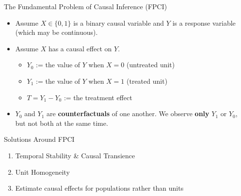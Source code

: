 \documentclass{beamer}
\begin{document}
\begin{frame}{The Fundamental Problem of Causal Inference (FPCI)}
  \begin{itemize}
    \item<+-> Assume $X \in\{0,1\}$ is a binary causal variable and $Y$ is a response variable (which may be continuous).
    \item<+-> Assume $X$ has a causal effect on $Y$.
    \begin{itemize}
      \item $Y_0$ := the value of $Y$ when $X=0$ (untreated unit)
      \item $Y_1$ := the value of $Y$ when $X=1$ (treated unit)
      \item $T = Y_1 - Y_0$ := the treatment effect
    \end{itemize}
    \item<+-> $Y_0$ and $Y_1$ are \textbf{counterfactuals} of one another. We observe \textbf{only} $Y_1$ or $Y_0$, but not both at the same time.
  \end{itemize}
\end{frame}

\begin{frame}{Solutions Around FPCI}
  \begin{enumerate}
    \item<+-> Temporal Stability \& Causal Transience
    \item<+-> Unit Homogeneity
    \item<+-> Estimate causal effects for populations rather than units
  \end{enumerate}
\end{frame}
\end{document}

